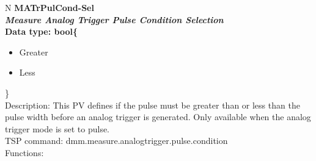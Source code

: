 \documentclass[openany]{article}
\begin{document}
		\begin{tabular}{N}
			\hline
			\bfseries MATrPulCond-Sel\label{pv:matrpulcond-sel} \\ \hline
			\emph{Measure Analog Trigger Pulse Condition Selection} \\
			Data type: bool\{\begin{itemize}[noitemsep]
				\small
				\item[] Greater
				\item[] Less
			\end{itemize}\} \\
			Description: This PV defines if the pulse must be greater than or less than the pulse width before an analog trigger is generated. Only available when the analog trigger mode is set to pulse. \\
			TSP command: dmm.measure.analogtrigger.pulse.condition \\
			Functions: \\
			\arrayrulecolor{\FuncTableBorderColor}

		\end{tabular}
\end{document}
